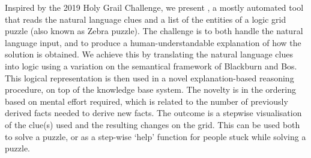 Inspired by the 2019 Holy Grail Challenge, we present \ourtool, a mostly automated tool that reads the natural language clues and a list of the entities of a logic grid puzzle (also known as Zebra puzzle). The challenge is to both handle the natural language input, and to produce a human-understandable explanation of how the solution is obtained.
We achieve this by translating the natural language clues into logic using a variation on the semantical framework of Blackburn and Bos. This logical representation is then used in a novel explanation-based reasoning procedure, on top of the \idp knowledge base system. The novelty is in the ordering based on mental effort required, which is related to the number of previously derived facts needed to derive new facts. The outcome is a stepwise visualisation of the clue(s) used and the resulting changes on the grid.
This can be used both to solve a puzzle, or as a step-wise `help' function for people stuck while solving a puzzle.

